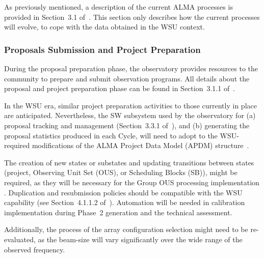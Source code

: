 As previously mentioned, a description of the current ALMA processes is provided in Section~3.1 of~\cite{CSA-IA}. This section only describes how the current processes will evolve, to cope with the data obtained in the WSU context. 

\subsubsection{Proposals Submission and Project Preparation}
During the proposal preparation phase, the observatory provides resources to the community to prepare and submit observation programs. All details about the proposal and project preparation phase can be found in Section~3.1.1 of~\cite{CSA-IA}.  

In the WSU era, similar project preparation activities to those currently in place are anticipated. Nevertheless, the SW subsystem used by the observatory for (a) proposal tracking and management (Section~3.3.1 of~\cite{CSA-IA}), and (b) generating the proposal statistics produced in each Cycle, will need to adopt to the WSU-required modifications of the ALMA Project Data Model (APDM) structure~\cite{apdm}. 

The creation of new states or substates and updating transitions between states (project, Observing Unit Set (OUS), or Scheduling Blocks (SB)), might be required, as they will be necessary for the Group OUS processing implementation \cite{dp}. Duplication and resubmission policies should be compatible with the WSU capability (see Section~4.1.1.2 of~\cite{CSA-IA}). Automation will be needed in calibration implementation during Phase~2 generation and the technical assessment.

Additionally, the process of the array configuration selection might need to be re-evaluated, as the beam-size will vary significantly over the wide range of the observed frequency.



